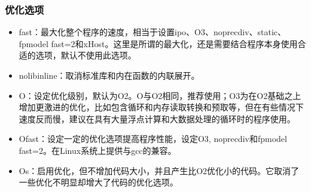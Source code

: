\documentclass[a4paper,12pt,english]{sphinxmanual}
\begin{document}
\subsubsection{优化选项}
\label{\detokenize{compiler/intel:id3}}\begin{itemize}
\item {} 
\sphinxAtStartPar
\sphinxhyphen{}fast：最大化整个程序的速度，相当于设置\sphinxhyphen{}ipo、\sphinxhyphen{}O3、\sphinxhyphen{}no\sphinxhyphen{}prec\sphinxhyphen{}div、\sphinxhyphen{}static、\sphinxhyphen{}fp\sphinxhyphen{}model fast=2和\sphinxhyphen{}xHost。这里是所谓的最大化，还是需要结合程序本身使用合适的选项，默认不使用此选项。

\item {} 
\sphinxAtStartPar
\sphinxhyphen{}nolib\sphinxhyphen{}inline：取消标准库和内在函数的内联展开。

\item {} 
\sphinxAtStartPar
\sphinxhyphen{}O：设定优化级别，默认为O2。O与O2相同，推荐使用；O3为在O2基础之上增加更激进的优化，比如包含循环和内存读取转换和预取等，但在有些情况下速度反而慢，建议在具有大量浮点计算和大数据处理的循环时的程序使用。

\item {} 
\sphinxAtStartPar
\sphinxhyphen{}Ofast：设定一定的优化选项提高程序性能，设定\sphinxhyphen{}O3, \sphinxhyphen{}no\sphinxhyphen{}prec\sphinxhyphen{}div和\sphinxhyphen{}fp\sphinxhyphen{}model fast=2。在Linux系统上提供与gcc的兼容。

\item {} 
\sphinxAtStartPar
\sphinxhyphen{}Os：启用优化，但不增加代码大小，并且产生比\sphinxhyphen{}O2优化小的代码。它取消了一些优化不明显却增大了代码的优化选项。

\end{itemize}
\end{document}
